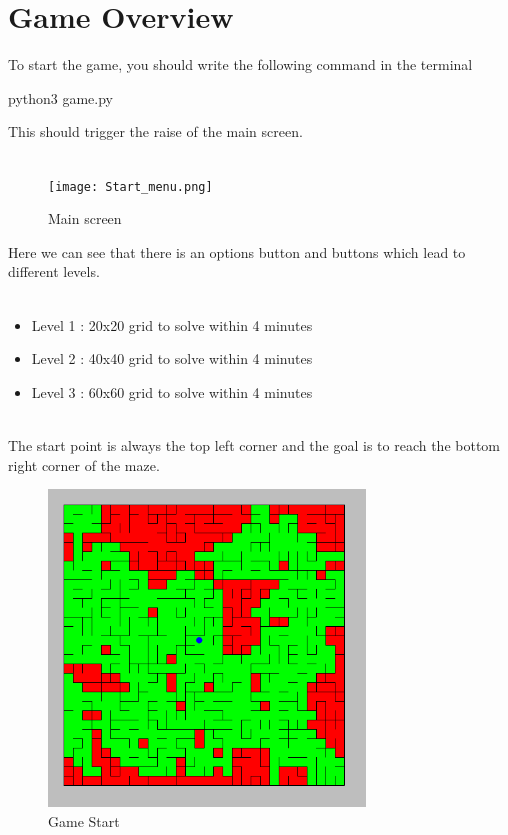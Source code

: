 \documentclass{article}
\begin{document}
\section{Game Overview}
To start the game, you should write the following command in the terminal
\begin{center}
     python3 game.py 
\end{center}
This should trigger the raise of the main screen.\\ \\
\begin{figure}[H]
    \centering
    \texttt{[image: Start\_menu.png]}
    \caption{Main screen}
    \label{fig:main_screen}
\end{figure}
Here we can see that there is an options button and buttons which lead to different levels.\\ \\
\begin{itemize}
    \item Level 1 : 20x20 grid to solve within 4 minutes
    \item Level 2 : 40x40 grid to solve within 4 minutes
    \item Level 3 : 60x60 grid to solve within 4 minutes
\end{itemize}
\\
The start point is always the top left corner and the goal is to reach the bottom right corner of the maze.\\
\begin{figure}[H]
    \centering
    \includegraphics[width=0.75\textwidth]{maze.png}
    \caption{Game Start}
    \label{fig:Game_start}
\end{figure}
\end{document}
